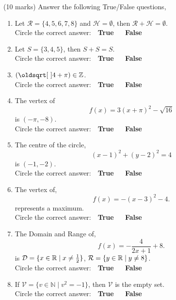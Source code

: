 \documentclass[12pt]{article} %
\begin{document}
\begin{qstn} %
  (10 marks) Answer the following True/False questions,
  \begin{enumerate}
    \item Let $\mathcal{R} = \{4,5,6,7,8\} $ and $\mathcal{H} = \emptyset $, then $\mathcal{R} + \mathcal{H} = \emptyset $.\\
      Circle the correct answer: \,\, \textbf{True} \,\,\,\,\,\, \textbf{False}

    \item Let $S = \{3,4,5\} $, then $S + S = S$.\\
      Circle the correct answer: \,\, \textbf{True} \,\,\,\,\,\, \textbf{False}

    \item $(\sqrt{4} + \pi) \in \Z$.\\
      Circle the correct answer: \,\, \textbf{True} \,\,\,\,\,\, \textbf{False}

    \item The vertex of 
      \[
        f(x) = 3\left( x + \pi \right)^2 - \sqrt{16}  
      \] is $(-\pi,-8)$.\\ 
      Circle the correct answer: \,\, \textbf{True} \,\,\,\,\,\, \textbf{False}

    \item The centre of the circle,
      \[
            (x-1)^2 + (y -2)^2 = 4
      \] is $(-1,-2)$.\\
      Circle the correct answer: \,\, \textbf{True} \,\,\,\,\,\, \textbf{False}

    \item The vertex of,
      \[
            f(x) = -\left( x - 3 \right)^2 - 4
      .\] represents a maximum.\\
      Circle the correct answer: \,\, \textbf{True} \,\,\,\,\,\, \textbf{False}
    \item The Domain and Range of,
      \[
              f(x) = -\frac{4}{2x + 1} + 8
    .\] is $\mathcal{D} = \{x \in \mathbb R \mid x \neq \frac{1}{2}\} $, $\mathcal{R} = \{y \in \mathbb R \mid y \neq 8\} $.\\
      Circle the correct answer: \,\, \textbf{True} \,\,\,\,\,\, \textbf{False}

    \item If $\mathcal{V} = \{v \in \mathbb N \mid v^2 = -1\}$, then $\mathcal{V}$ is the empty set.\\
      Circle the correct answer: \,\, \textbf{True} \,\,\,\,\,\, \textbf{False}


\end{enumerate}
\end{qstn}
\end{document}
